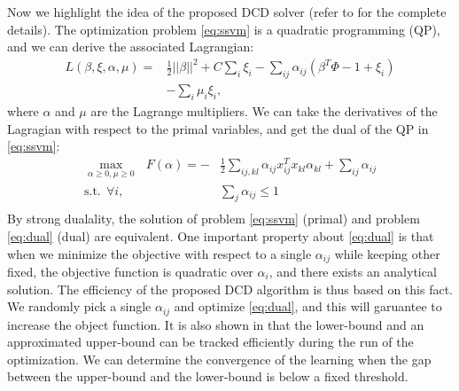 \documentclass[10pt,twocolumn,letterpaper]{article}
\begin{document}
Now we highlight the idea of the proposed DCD solver (refer to \cite{Ramanan_TR2012} for the complete details). The optimization problem \ref{eq:ssvm} is a quadratic programming (QP), and we can derive the associated Lagrangian:
\begin{equation}
  \begin{split}
  L(\beta,\xi,\alpha,\mu) = & \frac{1}{2}||\beta||^2+C\sum_i\xi_i-\sum_{ij}\alpha_{ij}(\beta^{T}\Phi-1+\xi_i) \\
                            & -\sum_{i}\mu_i\xi_i,
  \end{split}
\end{equation}
where $\alpha$ and $\mu$ are the Lagrange multipliers. We can take the derivatives of the Lagragian with respect to the primal variables, and get the dual of the QP in \ref{eq:ssvm}:
\begin{equation}
  \begin{split}
  \max_{\alpha\geq0,\mu\geq0} ~~~F(\alpha) = - & \frac{1}{2}\sum_{ij,kl}\alpha_{ij}x^{T}_{ij}x_{kl}\alpha_{kl}+\sum_{ij}\alpha_{ij} \\
  \text{s.t.}~~ \forall i, ~~~& \sum_{j}\alpha_{ij}\leq 1 \\
  \end{split}
\label{eq:dual}
\end{equation}
By strong dualality, the solution of problem \ref{eq:ssvm} (primal) and problem \ref{eq:dual} (dual) are equivalent. One important property about \ref{eq:dual} is that when we minimize the objective with respect to a single $\alpha_{ij}$ while keeping other fixed, the objective function is quadratic over $\alpha_i$, and there exists an analytical solution. The efficiency of the proposed DCD algorithm is thus based on this fact. We randomly pick a single $\alpha_{ij}$ and optimize \ref{eq:dual}, and this will garuantee to increase the object function. It is also shown in \cite{Ramanan_TR2012} that the lower-bound and an approximated upper-bound can be tracked efficiently during the run of the optimization. We can determine the convergence of the learning when the gap between the upper-bound and the lower-bound is below a fixed threshold.
\end{document}

